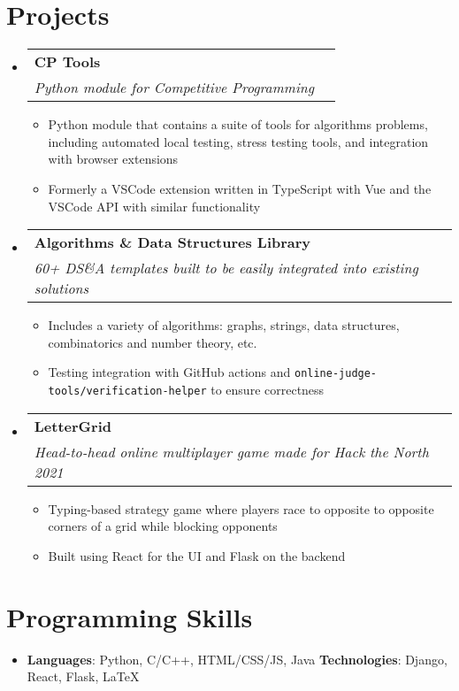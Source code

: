 \documentclass[letterpaper,11pt]{article}
\makeatletter
\newcommand{\resumeText}[1]{
  \item\small{
    \textbf{}{#1 \vspace{-2pt}}
  }
}
\newcommand{\resumeSubheading}[4]{
  \vspace{-1pt}\item
    \begin{tabular*}{0.97\textwidth}[t]{l@{\extracolsep{\fill}}r}
      \textbf{#1} & #2 \\
      \textit{\small#3} & \textit{\small #4} \\
    \end{tabular*}\vspace{-5pt}
}
\newcommand{\resumeSubHeadingListStart}{\begin{itemize}[leftmargin=*]}
\newcommand{\resumeSubHeadingListEnd}{\end{itemize}}
\newcommand{\resumeItemListStart}{\begin{itemize}}
\newcommand{\resumeItemListEnd}{\end{itemize}\vspace{-5pt}}
\newcommand{\code}[1]{\colorbox{light-gray}{\texttt{#1}}}
\makeatother
\begin{document}
\section{Projects}
  \resumeSubHeadingListStart
    \resumeSubheading{CP Tools}{}
      {Python module for Competitive Programming}{}
      \resumeItemListStart
        \resumeText{Python module that contains a suite of tools for algorithms problems, including automated local testing, stress testing tools, and integration with browser extensions}
        \resumeText{Formerly a VSCode extension written in TypeScript with Vue and the VSCode API with similar functionality}
      \resumeItemListEnd
    \resumeSubheading{Algorithms \& Data Structures Library}{}
      {60+ DS\&A templates built to be easily integrated into existing solutions}{}
      \resumeItemListStart
        \resumeText{Includes a variety of algorithms: graphs, strings, data structures, combinatorics and number theory, etc.}{}
        \resumeText{Testing integration with GitHub actions and \code{online-judge-tools/verification-helper} to ensure correctness}
      \resumeItemListEnd
    \resumeSubheading{LetterGrid}{}
      {Head-to-head online multiplayer game made for Hack the North 2021}{}
      \resumeItemListStart
        \resumeText{Typing-based strategy game where players race to opposite to opposite corners of a grid while blocking opponents}
        \resumeText{Built using React for the UI and Flask on the backend}
      \resumeItemListEnd
  \resumeSubHeadingListEnd

\section{Programming Skills}
 \resumeSubHeadingListStart
   \item{
     \textbf{Languages}{: Python, C/C++, HTML/CSS/JS, Java}
     \hfill
     \textbf{Technologies}{: Django, React, Flask, LaTeX}
   }
 \resumeSubHeadingListEnd

\end{document}
